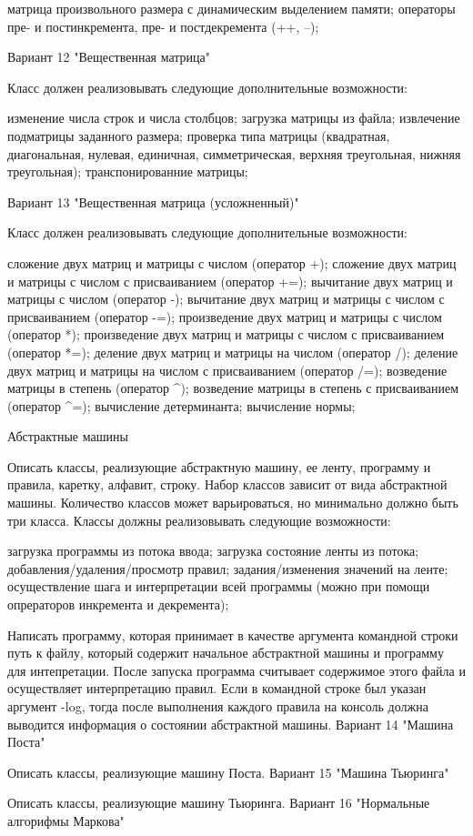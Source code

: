 \documentclass[a4paper,12pt]{article}
\begin{document}
матрица произвольного размера с динамическим выделением памяти;
операторы пре- и постинкремента, пре- и постдекремента (++, --); 

Вариант 12 "Вещественная матрица"

Класс должен реализовывать следующие дополнительные возможности:

изменение числа строк и числа столбцов;
загрузка матрицы из файла;
извлечение подматрицы заданного размера;
проверка типа матрицы (квадратная, диагональная, нулевая, единичная, симметрическая, верхняя треугольная, нижняя треугольная);
транспонированние матрицы; 

Вариант 13 "Вещественная матрица (усложненный)"

Класс должен реализовывать следующие дополнительные возможности:

сложение двух матриц и матрицы с числом (оператор +);
сложение двух матриц и матрицы с числом с присваиванием (оператор +=);
вычитание двух матриц и матрицы с числом (оператор -);
вычитание двух матриц и матрицы с числом с присваиванием (оператор -=);
произведение двух матриц и матрицы с числом (оператор *);
произведение двух матриц и матрицы с числом с присваиванием (оператор *=);
деление двух матриц и матрицы на числом (оператор /);
деление двух матриц и матрицы на числом с присваиванием (оператор /=);
возведение матрицы в степень (оператор ^);
возведение матрицы в степень с присваиванием (оператор ^=);
вычисление детерминанта;
вычисление нормы; 

Абстрактные машины

Описать классы, реализующие абстрактную машину, ее ленту, программу и правила, каретку, алфавит, строку. Набор классов зависит от вида абстрактной машины. Количество классов может варьироваться, но минимально должно быть три класса.
Классы должны реализовывать следующие возможности:

загрузка программы из потока ввода;
загрузка состояние ленты из потока;
добавления/удаления/просмотр правил;
задания/изменения значений на ленте;
осуществление шага и интерпретации всей программы (можно при помощи опрераторов инкремента и декремента); 

Написать программу, которая принимает в качестве аргумента командной строки путь к файлу, который содержит начальное абстрактной машины и программу для интепретации. После запуска программа считывает содержимое этого файла и осуществляет интерпретацию правил. Если в командной строке был указан аргумент -log, тогда после выполнения каждого правила на консоль должна выводится информация о состоянии абстрактной машины.
Вариант 14 "Машина Поста"

Описать классы, реализующие машину Поста.
Вариант 15 "Машина Тьюринга"

Описать классы, реализующие машину Тьюринга.
Вариант 16 "Нормальные алгорифмы Маркова"
\end{document}
